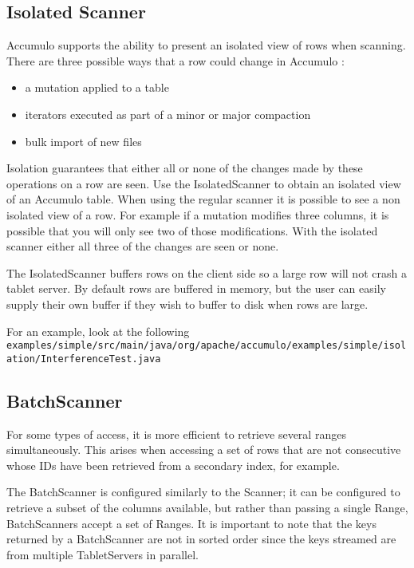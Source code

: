 \subsection{Isolated Scanner}

Accumulo supports the ability to present an isolated view of rows when
scanning. There are three possible ways that a row could change in Accumulo :

\begin{itemize}
 \item a mutation applied to a table
 \item iterators executed as part of a minor or major compaction
 \item bulk import of new files
\end{itemize}

Isolation guarantees that either all or none of the changes made by these
operations on a row are seen. Use the IsolatedScanner to obtain an isolated
view of an Accumulo table. When using the regular scanner it is possible to see
a non isolated view of a row. For example if a mutation modifies three
columns, it is possible that you will only see two of those modifications.
With the isolated scanner either all three of the changes are seen or none.

The IsolatedScanner buffers rows on the client side so a large row will not
crash a tablet server. By default rows are buffered in memory, but the user
can easily supply their own buffer if they wish to buffer to disk when rows are
large.

For an example, look at the following\\
\texttt{examples/simple/src/main/java/org/apache/accumulo/examples/simple/isolation/InterferenceTest.java}

\subsection{BatchScanner}

For some types of access, it is more efficient to retrieve several ranges
simultaneously. This arises when accessing a set of rows that are not consecutive
whose IDs have been retrieved from a secondary index, for example.

The BatchScanner is configured similarly to the Scanner; it can be configured to
retrieve a subset of the columns available, but rather than passing a single Range,
BatchScanners accept a set of Ranges. It is important to note that the keys returned
by a BatchScanner are not in sorted order since the keys streamed are from multiple
TabletServers in parallel.

